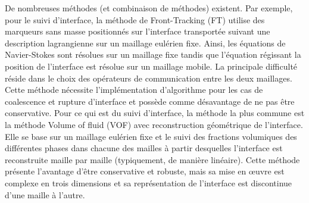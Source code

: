 
De nombreuses méthodes (et combinaison de méthodes) existent. Par exemple, pour le suivi d'interface, la méthode de Front-Tracking (FT) utilise des marqueurs sans masse positionnés sur l'interface transportée suivant une description lagrangienne sur un maillage eulérien fixe. Ainsi, les équations de Navier-Stokes sont résolues sur un maillage fixe tandis que l'équation régissant la position de l'interface est résolue sur un maillage mobile. La principale difficulté réside dans le choix des opérateurs de communication entre les deux maillages. Cette méthode nécessite l'implémentation d'algorithme pour les cas de coalescence et rupture d'interface et possède comme désavantage de ne pas être conservative. Pour ce qui est du suivi d'interface, la méthode la plus commune est la méthode Volume of fluid (VOF) avec reconstruction géométrique de l'interface. Elle se base sur un maillage eulérien fixe et le suivi des fractions volumiques des différentes phases dans chacune des mailles à partir desquelles l'interface est reconstruite maille par maille (typiquement, de manière linéaire). Cette méthode présente l'avantage d'être conservative et robuste, mais sa mise en \oe uvre est complexe en trois dimensions et sa représentation de l'interface est discontinue d'une maille à l'autre.


